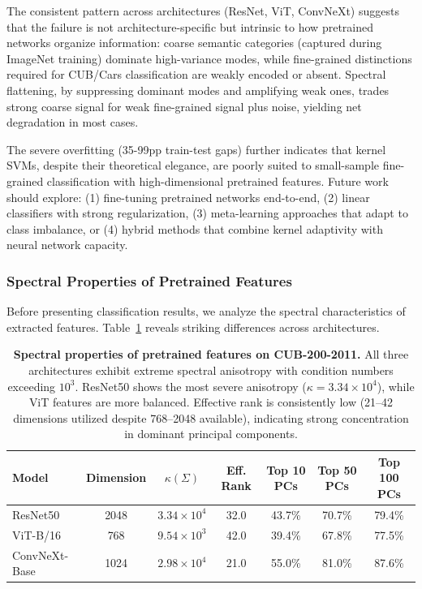 \documentclass[11pt]{article}
\begin{document}
The consistent pattern across architectures (ResNet, ViT, ConvNeXt) suggests that the failure is not architecture-specific but intrinsic to how pretrained networks organize information: coarse semantic categories (captured during ImageNet training) dominate high-variance modes, while fine-grained distinctions required for CUB/Cars classification are weakly encoded or absent. Spectral flattening, by suppressing dominant modes and amplifying weak ones, trades strong coarse signal for weak fine-grained signal plus noise, yielding net degradation in most cases.

The severe overfitting (35-99pp train-test gaps) further indicates that kernel SVMs, despite their theoretical elegance, are poorly suited to small-sample fine-grained classification with high-dimensional pretrained features. Future work should explore: (1) fine-tuning pretrained networks end-to-end, (2) linear classifiers with strong regularization, (3) meta-learning approaches that adapt to class imbalance, or (4) hybrid methods that combine kernel adaptivity with neural network capacity.

\subsubsection{Spectral Properties of Pretrained Features}

Before presenting classification results, we analyze the spectral characteristics of extracted features. Table~\ref{tab:spectral_properties} reveals striking differences across architectures.

\begin{table}[h]
\centering
\caption{\textbf{Spectral properties of pretrained features on CUB-200-2011.} All three architectures exhibit extreme spectral anisotropy with condition numbers exceeding $10^3$. ResNet50 shows the most severe anisotropy ($\kappa = 3.34 \times 10^4$), while ViT features are more balanced. Effective rank is consistently low (21--42 dimensions utilized despite 768--2048 available), indicating strong concentration in dominant principal components.}
\label{tab:spectral_properties}
\begin{tabular}{lcccccc}
\toprule
Model & Dimension & $\kappa(\Sigma)$ & Eff. Rank & Top 10 PCs & Top 50 PCs & Top 100 PCs \\
\midrule
ResNet50      & 2048 & $3.34 \times 10^4$ & 32.0 & 43.7\% & 70.7\% & 79.4\% \\
ViT-B/16      & 768  & $9.54 \times 10^3$ & 42.0 & 39.4\% & 67.8\% & 77.5\% \\
ConvNeXt-Base & 1024 & $2.98 \times 10^4$ & 21.0 & 55.0\% & 81.0\% & 87.6\% \\
\bottomrule
\end{tabular}
\end{table}
\end{document}
